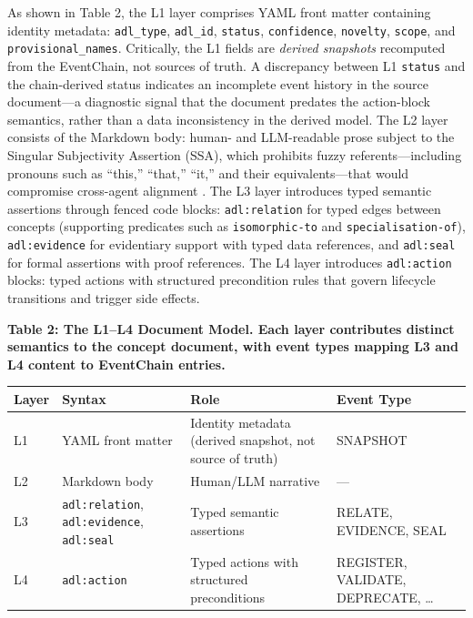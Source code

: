 As shown in Table 2, the L1 layer comprises YAML front matter containing identity metadata: \texttt{adl\_type}, \texttt{adl\_id}, \texttt{status}, \texttt{confidence}, \texttt{novelty}, \texttt{scope}, and \texttt{provisional\_names}. Critically, the L1 fields are \emph{derived snapshots} recomputed from the EventChain, not sources of truth. A discrepancy between L1 \texttt{status} and the chain-derived status indicates an incomplete event history in the source document---a diagnostic signal that the document predates the action-block semantics, rather than a data inconsistency in the derived model. The L2 layer consists of the Markdown body: human- and LLM-readable prose subject to the Singular Subjectivity Assertion (SSA), which prohibits fuzzy referents---including pronouns such as ``this,'' ``that,'' ``it,'' and their equivalents---that would compromise cross-agent alignment \cite{ref16}. The L3 layer introduces typed semantic assertions through fenced code blocks: \texttt{adl:relation} for typed edges between concepts (supporting predicates such as \texttt{isomorphic-to} and \texttt{specialisation-of}), \texttt{adl:evidence} for evidentiary support with typed data references, and \texttt{adl:seal} for formal assertions with proof references. The L4 layer introduces \texttt{adl:action} blocks: typed actions with structured precondition rules that govern lifecycle transitions and trigger side effects.

\textbf{Table 2: The L1--L4 Document Model. Each layer contributes distinct semantics to the concept document, with event types mapping L3 and L4 content to EventChain entries.}

\begin{longtable}[]{@{}>{\raggedright\arraybackslash}p{}
  >{\raggedright\arraybackslash}p{}
  >{\raggedright\arraybackslash}p{}
  >{\raggedright\arraybackslash}p{}@{}}
\toprule
Layer
& Syntax
& Role
& Event Type
\\
\midrule
\endhead
\bottomrule
\endlastfoot
L1 & YAML front matter & Identity metadata (derived snapshot, not source of truth) & SNAPSHOT \\
L2 & Markdown body & Human/LLM narrative & --- \\
L3 & \texttt{adl:relation}, \texttt{adl:evidence}, \texttt{adl:seal} & Typed semantic assertions & RELATE, EVIDENCE, SEAL \\
L4 & \texttt{adl:action} & Typed actions with structured preconditions & REGISTER, VALIDATE, DEPRECATE, \ldots{} \\
\end{longtable}

